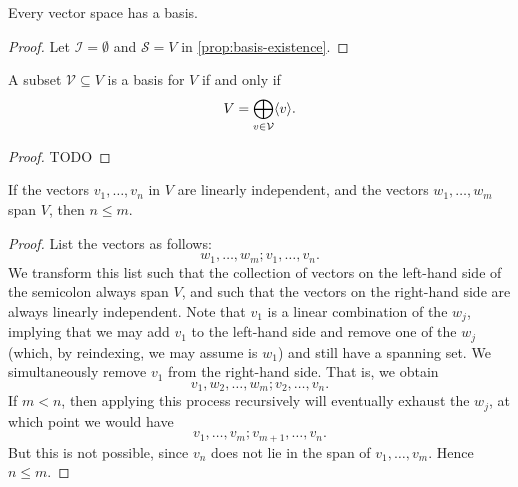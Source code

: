 \documentclass[a4paper, 11pt]{memoir}
\numberwithin{equation}{chapter}
\newcommand{\calV}{\mathcal{V}}
\newcommand{\calI}{\mathcal{I}}
\newcommand{\calS}{\mathcal{S}}
\begin{document}
\begin{corollary}
    Every vector space has a basis.
\end{corollary}

\begin{proof}
    Let $\calI = \emptyset$ and $\calS = V$ in \cref{prop:basis-existence}.
\end{proof}

\begin{proposition}
    A subset $\calV \subseteq V$ is a basis for $V$ if and only if
    \begin{equation*}
        V
            = \bigoplus_{v \in \calV} \gen{v}.
    \end{equation*}
\end{proposition}

\begin{proof}
    TODO
\end{proof}



\begin{proposition}
    If the vectors $v_1, \ldots, v_n$ in $V$ are linearly independent, and the vectors $w_1, \ldots, w_m$ span $V$, then $n \leq m$.
\end{proposition}

\begin{proof}
    List the vectors as follows:
    \begin{equation*}
        w_1, \ldots, w_m; v_1, \ldots, v_n.
    \end{equation*}
    We transform this list such that the collection of vectors on the left-hand side of the semicolon always span $V$, and such that the vectors on the right-hand side are always linearly independent. Note that $v_1$ is a linear combination of the $w_j$, implying that we may add $v_1$ to the left-hand side and remove one of the $w_j$ (which, by reindexing, we may assume is $w_1$) and still have a spanning set. We simultaneously remove $v_1$ from the right-hand side. That is, we obtain
    \begin{equation*}
        v_1, w_2, \ldots, w_m; v_2, \ldots, v_n.
    \end{equation*}
    If $m < n$, then applying this process recursively will eventually exhaust the $w_j$, at which point we would have
    \begin{equation*}
        v_1, \ldots, v_m; v_{m+1}, \ldots, v_n.
    \end{equation*}
    But this is not possible, since $v_n$ does not lie in the span of $v_1, \ldots, v_m$. Hence $n \leq m$.
\end{proof}
\end{document}
